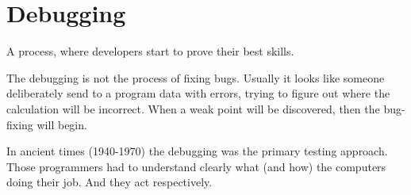 \section{Debugging}
\label{sec:Debugging}

A process, where developers start to prove their best skills.

The debugging is not the process of fixing bugs. Usually it looks like someone deliberately send to a program data with errors, trying to figure out where the calculation will be incorrect. When a weak point will be discovered, then the bug-fixing will begin.

In ancient times (1940-1970) the debugging was the primary testing approach. Those programmers had to understand clearly what (and how) the computers doing their job. And they act respectively.
